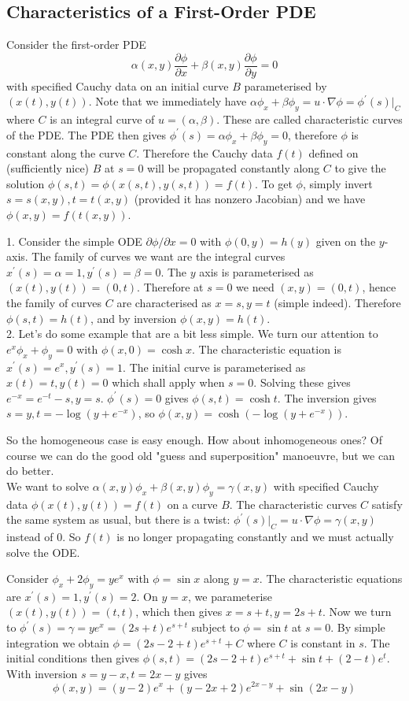 \subsection{Characteristics of a First-Order PDE}
Consider the first-order PDE
$$\alpha(x,y)\frac{\partial\phi}{\partial x}+\beta(x,y)\frac{\partial\phi}{\partial y}=0$$
with specified Cauchy data on an initial curve $B$ parameterised by $(x(t),y(t))$.
Note that we immediately have $\alpha\phi_x+\beta\phi_y=u\cdot\nabla\phi=\phi^\prime(s)|_C$ where $C$ is an integral curve of $u=(\alpha,\beta)$.
These are called characteristic curves of the PDE.
The PDE then gives $\phi^\prime(s)=\alpha\phi_x+\beta\phi_y=0$, therefore $\phi$ is constant along the curve $C$.
Therefore the Cauchy data $f(t)$ defined on (sufficiently nice) $B$ at $s=0$ will be propagated constantly along $C$ to give the solution $\phi(s,t)=\phi(x(s,t),y(s,t))=f(t)$.
To get $\phi$, simply invert $s=s(x,y),t=t(x,y)$ (provided it has nonzero Jacobian) and we have $\phi(x,y)=f(t(x,y))$.
\begin{example}
    1. Consider the simple ODE $\partial\phi/\partial x=0$ with $\phi(0,y)=h(y)$ given on the $y$-axis.
    The family of curves we want are the integral curves $x^\prime(s)=\alpha=1,y^\prime(s)=\beta=0$.
    The $y$ axis is parameterised as $(x(t),y(t))=(0,t)$.
    Therefore at $s=0$ we need $(x,y)=(0,t)$, hence the family of curves $C$ are characterised as $x=s,y=t$ (simple indeed).
    Therefore $\phi(s,t)=h(t)$, and by inversion $\phi(x,y)=h(t)$.\\
    2. Let's do some example that are a bit less simple.
    We turn our attention to $e^x\phi_x+\phi_y=0$ with $\phi(x,0)=\cosh x$.
    The characteristic equation is $x^\prime(s)=e^x,y^\prime(s)=1$.
    The initial curve is parameterised as $x(t)=t,y(t)=0$ which shall apply when $s=0$.
    Solving these gives $e^{-x}=e^{-t}-s,y=s$.
    $\phi^\prime(s)=0$ gives $\phi(s,t)=\cosh t$.
    The inversion gives $s=y,t=-\log(y+e^{-x})$, so $\phi(x,y)=\cosh(-\log(y+e^{-x}))$.
\end{example}
So the homogeneous case is easy enough.
How about inhomogeneous ones?
Of course we can do the good old "guess and superposition" manoeuvre, but we can do better.\\
We want to solve $\alpha(x,y)\phi_x+\beta(x,y)\phi_y=\gamma(x,y)$ with specified Cauchy data $\phi(x(t),y(t))=f(t)$ on a curve $B$.
The characteristic curves $C$ satisfy the same system as usual, but there is a twist:
$\phi^\prime(s)|_C=u\cdot\nabla\phi=\gamma(x,y)$ instead of $0$.
So $f(t)$ is no longer propagating constantly and we must actually solve the ODE.
\begin{example}
    Consider $\phi_x+2\phi_y=ye^x$ with $\phi=\sin x$ along $y=x$.
    The characteristic equations are $x^\prime(s)=1,y^\prime(s)=2$.
    On $y=x$, we parameterise $(x(t),y(t))=(t,t)$, which then gives $x=s+t,y=2s+t$.
    Now we turn to $\phi^\prime(s)=\gamma=ye^x=(2s+t)e^{s+t}$ subject to $\phi=\sin t$ at $s=0$.
    By simple integration we obtain $\phi=(2s-2+t)e^{s+t}+C$ where $C$ is constant in $s$.
    The initial conditions then gives $\phi(s,t)=(2s-2+t)e^{s+t}+\sin t+(2-t)e^t$.
    With inversion $s=y-x,t=2x-y$ gives
    $$\phi(x,y)=(y-2)e^x+(y-2x+2)e^{2x-y}+\sin(2x-y)$$
\end{example}
